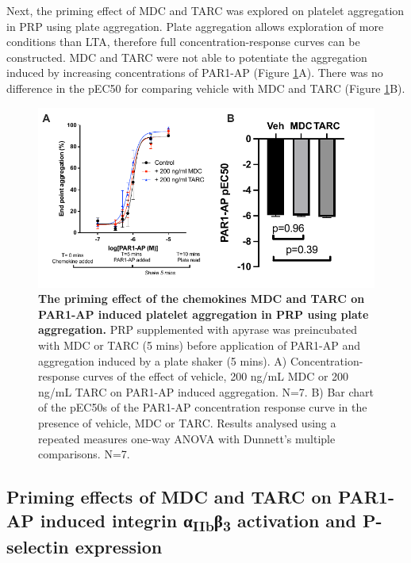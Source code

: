 \documentclass[11pt,twoside]{bristolthesis}
\begin{document}
Next, the priming effect of MDC and TARC was explored on platelet aggregation in PRP using plate aggregation. Plate aggregation allows exploration of more conditions than LTA, therefore full concentration-response curves can be constructed. MDC and TARC were not able to potentiate the aggregation induced by increasing concentrations of PAR1-AP (Figure \ref{fig:MDC-TARC-agg-PRP}A). There was no difference in the pEC50 for comparing vehicle with MDC and TARC (Figure \ref{fig:MDC-TARC-agg-PRP}B).



\begin{figure}

{\centering \includegraphics{figure/Chemokines/Layouts/MDC_TARC_PRP_plate_agg} 

}

\caption[The priming effect of the chemokines MDC and TARC on PAR1-AP induced platelet aggregation in PRP using plate aggregation]{\textbf{The priming effect of the chemokines MDC and TARC on PAR1-AP induced platelet aggregation in PRP using plate aggregation.} PRP supplemented with apyrase was preincubated with MDC or TARC (5 mins) before application of PAR1-AP and aggregation induced by a plate shaker (5 mins). A) Concentration-response curves of the effect of vehicle, 200 ng/mL MDC or 200 ng/mL TARC on PAR1-AP induced aggregation. N=7. B) Bar chart of the pEC50s of the PAR1-AP concentration response curve in the presence of vehicle, MDC or TARC. Results analysed using a repeated measures one-way ANOVA with Dunnett's multiple comparisons. N=7.}\label{fig:MDC-TARC-agg-PRP}
\end{figure}
\hypertarget{priming-effects-of-mdc-and-tarc-on-par1-ap-induced-integrin-ux3b1iibux3b23-activation-and-p-selectin-expression}{%
\subsection{\texorpdfstring{Priming effects of MDC and TARC on PAR1-AP induced integrin α\textsubscript{IIb}β\textsubscript{3} activation and P-selectin expression}{Priming effects of MDC and TARC on PAR1-AP induced integrin αIIbβ3 activation and P-selectin expression}}\label{priming-effects-of-mdc-and-tarc-on-par1-ap-induced-integrin-ux3b1iibux3b23-activation-and-p-selectin-expression}}
\end{document}
